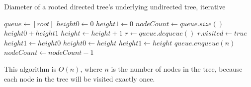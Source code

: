\documentclass{article}
\begin{document}
\begin{description}
  \begin{algorithm}[h]
  \caption{Diameter of a rooted directed tree's underlying undirected tree, iterative}
  \label{alg:tree-diameter-iterative}
    \begin{algorithmic}[1]
      \State $queue \gets [root]$
      \State $height0 \gets 0$
      \State $height1 \gets 0$
        \State $nodeCount \gets queue.size()$
          \State \Return $height0 + height1$
        \EndIf
        \State $height \gets height + 1$
          \State $r \gets queue.dequeue()$
          \State $r.visited \gets true$
              \State $height1 \gets height0$
              \State $height0 \gets height$
              \State $height1 \gets height$
            \EndIf
          \Else
              \State $queue.enqueue(n)$
            \EndFor
          \EndIf
          \State $nodeCount \gets nodeCount - 1$
        \EndWhile
      \EndWhile
    \EndFunction
    \end{algorithmic}
  \end{algorithm}

  This algorithm is $O(n)$, where $n$ is the number of nodes in the tree, because each node in the tree will be visited exactly once.

\end{description}
\end{document}
